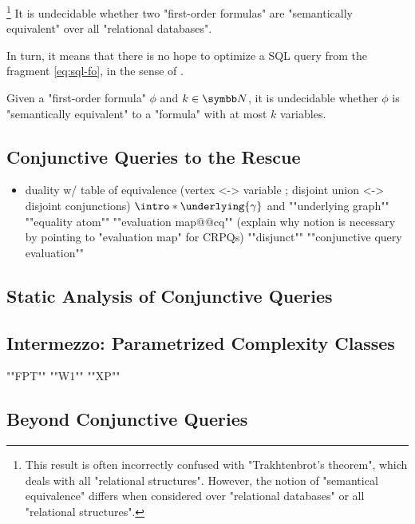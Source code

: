 \begin{proposition}
	\!\footnote{This result is often incorrectly confused with
	"Trakhtenbrot's theorem", which deals with all "relational structures".
	However, the notion of "semantical equivalence" differs when considered
	over "relational databases" or all "relational structures".}
	\AP\label{prop:Trakhtenbrot-db}
	It is undecidable whether two "first-order formulas"
	are "semantically equivalent" over all "relational databases".
\end{proposition}

In turn, it means that there is no hope to optimize a SQL query from the
fragment \eqref{eq:sql-fo}, in the sense of .%

\begin{proposition}
	Given a "first-order formula" $\phi$ and $k\in\N$, it is undecidable
	whether $\phi$ is "semantically equivalent" to a "formula" with at most $k$ variables.
\end{proposition}


\subsection{Conjunctive Queries to the Rescue}



\begin{itemize}
	\item duality w/ table of equivalence (vertex <-> variable ; disjoint union <-> disjoint conjunctions)
	\itemAP $\intro*\underlying{\gamma}$ and ""underlying graph""
	\itemAP ""equality atom""
	\itemAP ""evaluation map@@cq"" (explain why notion is necessary by pointing to "evaluation map" for CRPQs)
	\itemAP ""disjunct""
	\itemAP ""conjunctive query evaluation""
\end{itemize}

\subsection{Static Analysis of Conjunctive Queries}

\subsection{Intermezzo: Parametrized Complexity Classes}

\begin{itemize}
	\itemAP ""FPT""
	\itemAP ""W1""
	\itemAP ""XP""
\end{itemize}

\subsection{Beyond Conjunctive Queries}